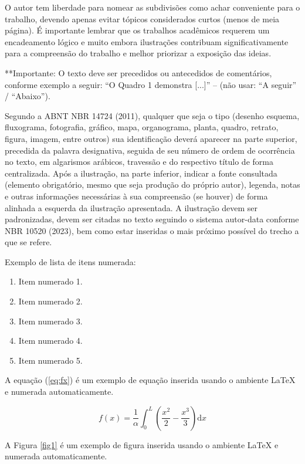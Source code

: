 \documentclass[
article,			%
11pt,				%
twoside,			%
a4paper,			%
section=TITLE,		%
onecolumn,          %
english,			%
brazil,				%
sumario=tradicional
]{abntex2}
\begin{document}
O autor tem liberdade para nomear as subdivisões como achar conveniente para o trabalho, devendo apenas evitar tópicos considerados curtos (menos de meia página). 
É importante lembrar que os trabalhos acadêmicos requerem um encadeamento lógico e muito embora ilustrações contribuam significativamente para a compreensão do trabalho e melhor priorizar a exposição das ideias.

**Importante: O texto deve ser precedidos ou antecedidos de comentários, conforme exemplo a seguir: “O Quadro 1 demonstra [...]” – (não usar: “A seguir” / “Abaixo”).

Segundo a ABNT NBR 14724 (2011), qualquer que seja o tipo (desenho esquema, fluxograma, fotografia, gráfico, mapa, organograma, planta, quadro, retrato, figura, imagem, entre outros) sua identificação deverá aparecer na parte superior, precedida da palavra designativa, seguida de seu número de ordem de ocorrência no texto, em algarismos arábicos, travessão e do respectivo título de forma centralizada. Após a ilustração, na parte inferior, indicar a fonte consultada (elemento obrigatório, mesmo que seja produção do próprio autor), legenda, notas e outras informações necessárias à sua compreensão (se houver) de forma alinhada a esquerda da ilustração apresentada. A ilustração devem ser padronizadas, devem ser citadas no texto seguindo o sistema autor-data conforme NBR 10520 (2023), bem como estar inseridas o mais próximo possível do trecho a que se refere.

Exemplo de lista de itens numerada:
\begin{enumerate}
\item Item numerado 1.
\item Item numerado 2.
\item Item numerado 3.
\item Item numerado 4.
\item Item numerado 5.
\end{enumerate}

A equação (\ref{eq:fx}) é um exemplo de equação inserida usando o ambiente LaTeX e numerada automaticamente.

\begin{equation}
\label{eq:fx}
f(x) = \frac{1}{\alpha} \int_0^L \left(\frac{x^2}{2} -\frac{x^3}{3}\right) \mathrm{d} x
\end{equation}


A Figura \ref{fig1} é um exemplo de figura inserida usando o ambiente LaTeX e numerada automaticamente.
\end{document}

